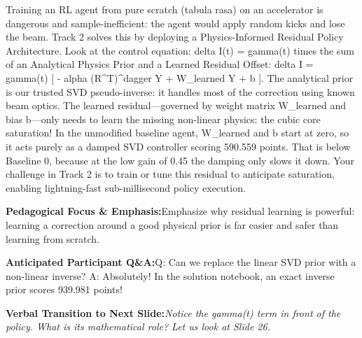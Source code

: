 \documentclass[11pt,a4paper]{article}
\begin{document}
\begin{tcolorbox}[colback=white,colframe=primaryblue,title={\footnotesize\bfseries\color{white}Spoken Presenter Script},fontupper=\small,left=6pt,right=6pt,top=3pt,bottom=3pt,boxrule=0.8pt,arc=2.5pt]
Training an RL agent from pure scratch (tabula rasa) on an accelerator is dangerous and sample-inefficient: the agent would apply random kicks and lose the beam. Track 2 solves this by deploying a Physics-Informed Residual Policy Architecture. Look at the control equation: delta I(t) = gamma(t) times the sum of an Analytical Physics Prior and a Learned Residual Offset: delta I = gamma(t) [ - alpha (R\textasciicircum{}T)\textasciicircum{}dagger Y + W\_learned Y + b ]. The analytical prior is our trusted SVD pseudo-inverse: it handles most of the correction using known beam optics. The learned residual—governed by weight matrix W\_learned and bias b—only needs to learn the missing non-linear physics: the cubic core saturation! In the unmodified baseline agent, W\_learned and b start at zero, so it acts purely as a damped SVD controller scoring 590.559 points. That is below Baseline 0, because at the low gain of 0.45 the damping only slows it down. Your challenge in Track 2 is to train or tune this residual to anticipate saturation, enabling lightning-fast sub-millisecond policy execution.
\end{tcolorbox}
\vspace{0.2em}
\begin{tcolorbox}[colback=lightbg,colframe=bordergray,left=6pt,right=6pt,top=3pt,bottom=3pt,boxrule=0.6pt,arc=2.5pt]
\small
\noindent\textbf{\color{navy}Pedagogical Focus \& Emphasis:}\enspace Emphasize why residual learning is powerful: learning a correction around a good physical prior is far easier and safer than learning from scratch.\par\vspace{0.3em}
\noindent\textbf{\color{successgreen}Anticipated Participant Q\&A:}\enspace Q: Can we replace the linear SVD prior with a non-linear inverse? A: Absolutely! In the solution notebook, an exact inverse prior scores 939.981 points!\par\vspace{0.3em}
\noindent\textbf{\color{accent}Verbal Transition to Next Slide:}\enspace \emph{Notice the gamma(t) term in front of the policy. What is its mathematical role? Let us look at Slide 26.}
\end{tcolorbox}
\clearpage
\hypertarget{slide.26}{}
{}
\end{document}
